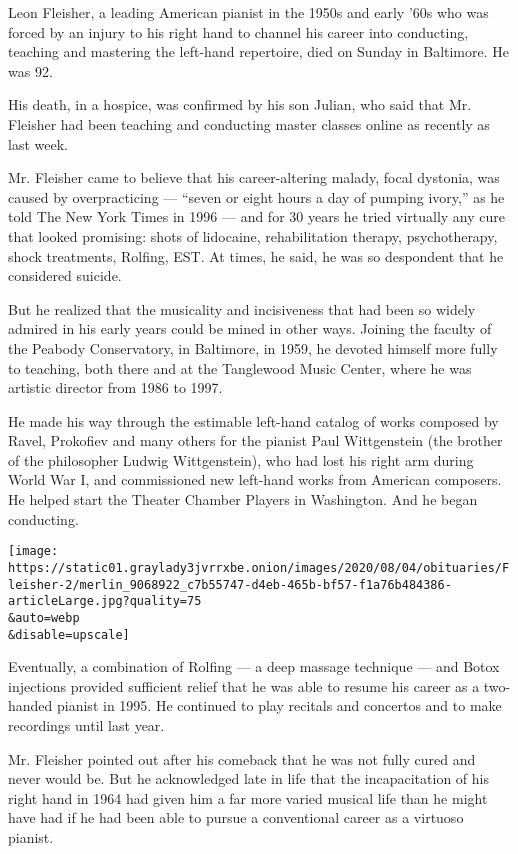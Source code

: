 Leon Fleisher, a leading American pianist in the 1950s and early '60s
who was forced by an injury to his right hand to channel his career into
conducting, teaching and mastering the left-hand repertoire, died on
Sunday in Baltimore. He was 92.

His death, in a hospice, was confirmed by his son Julian, who said that
Mr. Fleisher had been teaching and conducting master classes online as
recently as last week.

Mr. Fleisher came to believe that his career-altering malady, focal
dystonia, was caused by overpracticing --- ``seven or eight hours a day
of pumping ivory,'' as he told The New York Times in 1996 --- and for 30
years he tried virtually any cure that looked promising: shots of
lidocaine, rehabilitation therapy, psychotherapy, shock treatments,
Rolfing, EST. At times, he said, he was so despondent that he considered
suicide.

But he realized that the musicality and incisiveness that had been so
widely admired in his early years could be mined in other ways. Joining
the faculty of the Peabody Conservatory, in Baltimore, in 1959, he
devoted himself more fully to teaching, both there and at the Tanglewood
Music Center, where he was artistic director from 1986 to 1997.

He made his way through the estimable left-hand catalog of works
composed by Ravel, Prokofiev and many others for the pianist Paul
Wittgenstein (the brother of the philosopher Ludwig Wittgenstein), who
had lost his right arm during World War I, and commissioned new
left-hand works from American composers. He helped start the Theater
Chamber Players in Washington. And he began conducting.

\texttt{[image: https://static01.graylady3jvrrxbe.onion/images/2020/08/04/obituaries/Fleisher-2/merlin\_9068922\_c7b55747-d4eb-465b-bf57-f1a76b484386-articleLarge.jpg?quality=75\\\&auto=webp\\\&disable=upscale]}

Eventually, a combination of Rolfing --- a deep massage technique ---
and Botox injections provided sufficient relief that he was able to
resume his career as a two-handed pianist in 1995. He continued to play
recitals and concertos and to make recordings until last year.

Mr. Fleisher pointed out after his comeback that he was not fully cured
and never would be. But he acknowledged late in life that the
incapacitation of his right hand in 1964 had given him a far more varied
musical life than he might have had if he had been able to pursue a
conventional career as a virtuoso pianist.

